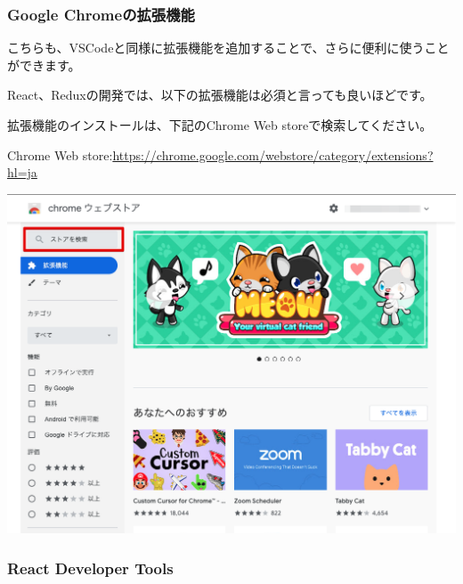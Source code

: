 \subsubsection*{Google Chromeの拡張機能}
\keeplastskip{
  \label{sec:1-3-1-1}
  \par\nobreak
}

こちらも、VSCodeと同様に拡張機能を追加することで、さらに便利に使うことができます。

React、Reduxの開発では、以下の拡張機能は必須と言っても良いほどです。

\vspace*{\baselineskip}

拡張機能のインストールは、下記のChrome Web storeで検索してください。

\vspace*{\baselineskip}

Chrome Web store:\url{https://chrome.google.com/webstore/category/extensions?hl=ja}

\begin{reviewimage}[H]%
\includegraphics[width=1.0\maxwidth]{./images/01-createDevEnv/01_13chromeWebstore.png}%
\label{image:01-createDevEnv:01_13chromeWebstore}
\end{reviewimage}

\clearpage


\subsubsection*{React Developer Tools}
\keeplastskip{
  \label{sec:1-3-1-2}
  \par\nobreak
}

